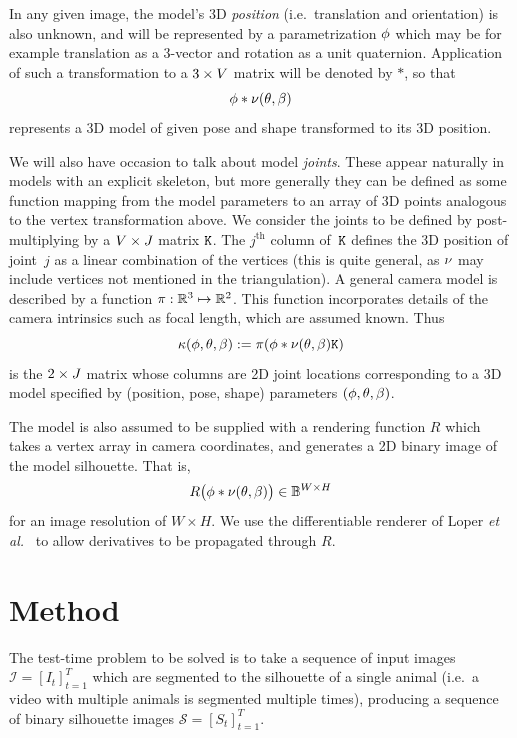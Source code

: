 In any given image, the model's 3D {\em position} (i.e.\ translation and orientation) is also unknown, and will be represented by a parametrization $\phi$ which may be for example translation as a 3-vector and rotation as a unit quaternion. Application of such a transformation to a $3\times V$ matrix will be denoted by $*$, so that 
\begin{equation}
\phi * \nu(\theta, \beta)
\end{equation}
represents a 3D model of given pose and shape transformed to its 3D position.

\def\proj{\pi}
We will also have occasion to talk about model {\em joints}.  These appear naturally in models with an explicit skeleton, but more generally they can be defined as some function mapping from the model parameters to an array of 3D points analogous to the vertex transformation above.  We consider the joints to be defined by post-multiplying by a $V \times J$ matrix $\mathtt{K}$.  The $j^{\text{th}}$ column of~$\mathtt{K}$ defines the 3D position of joint~$j$ as a linear combination of the vertices (this is quite general, as $\nu$ may include vertices not mentioned in the triangulation).  A general camera model is described by a function $\proj: \R 3 \mapsto \R 2$.  This function incorporates details of the camera intrinsics such as focal length, which are assumed known.  
Thus 
\begin{equation}
\kappa(\posn, \pose, \shape) := \proj(\posn * \verts(\pose, \shape) \jointselect)
\end{equation}
is the $2\times J$ matrix whose columns are 2D joint locations corresponding to a 3D model specified by (position, pose, shape) parameters $(\phi, \theta, \beta)$.

The model is also assumed to be supplied with a rendering function $R$ which takes a vertex array in camera coordinates, and generates a 2D binary image of the model silhouette.  That is,
\begin{equation}
R\bigl(\phi * \nu(\theta, \beta)\bigr) \in \mathbb{B}^{W\times H}
\end{equation}
for an image resolution of $W \times H$.  We use the differentiable renderer of Loper {\em et al.}~\cite{loper2014opendr} to allow derivatives to be propagated through $R$.  
\newpage
\section{Method}
\def\seq#1#2#3#4{\left[{#1_{#2}}\right]_{#2=#3}^{#4}}
The test-time problem to be solved is to take a sequence of input images
$
\mathcal I = \seq I t1T
$
which are segmented to the silhouette of a single animal (i.e.~a video with multiple animals is segmented multiple times), producing a sequence of binary silhouette images 
$
\mathcal S = \seq S t1T.
$


